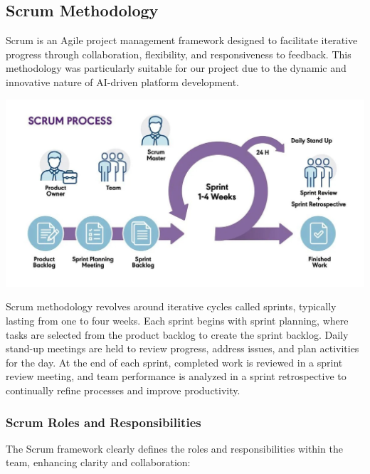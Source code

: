 \subsection{Scrum Methodology}
Scrum is an Agile project management framework designed to facilitate iterative progress through collaboration, flexibility, and responsiveness to feedback. This methodology was particularly suitable for our project due to the dynamic and innovative nature of AI-driven platform development.

\begin{center}
    \centering
    \includegraphics[width=1\textwidth]{Images/Scrum Process.jpeg}
     \cite{scrum_process}
    \label{fig:scrum_process}
\end{center}

Scrum methodology revolves around iterative cycles called sprints, typically lasting from one to four weeks. Each sprint begins with sprint planning, where tasks are selected from the product backlog to create the sprint backlog. Daily stand-up meetings are held to review progress, address issues, and plan activities for the day. At the end of each sprint, completed work is reviewed in a sprint review meeting, and team performance is analyzed in a sprint retrospective to continually refine processes and improve productivity.

\subsubsection{Scrum Roles and Responsibilities}
The Scrum framework clearly defines the roles and responsibilities within the team, enhancing clarity and collaboration:

